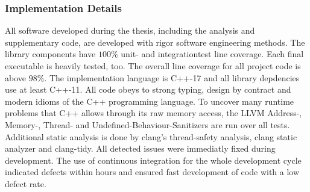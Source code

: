 \subsubsection{Implementation Details}

All software developed during the thesis, including the analysis and supplementary code, are developed with rigor software engineering methods.
The library components have $100\%$ unit- and integrationtest line coverage.
Each final executable is heavily tested, too.
The overall line coverage for all project code is above $98\%$.
The implementation language is C++-17\cite{c++17} and all library depdencies use at least C++-11\cite{c++11}.
All code obeys to strong typing, design by contract\cite{meyer_ieee1992} and modern idioms of the C++ programming language\cite{stroustrup_cpppl2013}.
To uncover many runtime problems that C++ allows through its raw memory access, the LLVM Address-, Memory-, Thread- and Undefined-Behaviour-Sanitizers\cite{google_sanitizers} are run over all tests.
Additional static analysis is done by clang's thread-safety analysis\cite{clang_thread_safety}, clang static analyzer\cite{clang_static_analyzer} and clang-tidy\cite{babati2017static}.
All detected issues were immediatly fixed during development.
The use of continuous integration\cite{fowler_ci2000} for the whole development cycle indicated defects within hours and ensured fast development of code with a low defect rate.

